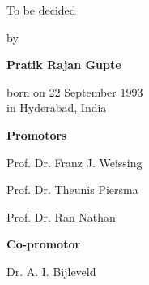 \begin{titlepage}
\begin{addmargin}[-1cm]{-3cm}
\begin{center}
{            \vspace{3mm}

            To be decided%

            \vspace{12mm}

            by

            \vspace{12mm}

            \textbf{Pratik Rajan Gupte}

            \vspace{3mm}

            born on 22 September 1993\\
            in Hyderabad, India
        }

    \end{center}

    \pagebreak
    \thispagestyle{empty}

    \textbf{Promotors}
    \begin{description}
        \item Prof. Dr. Franz J. Weissing
        \item Prof. Dr. Theunis Piersma
        \item Prof. Dr. Ran Nathan
    \end{description}

    \vspace{6mm}

    \textbf{Co-promotor}
    \begin{description}
        \item Dr. A. I. Bijleveld
    \end{description}



  \end{addmargin}

\end{titlepage}


    

